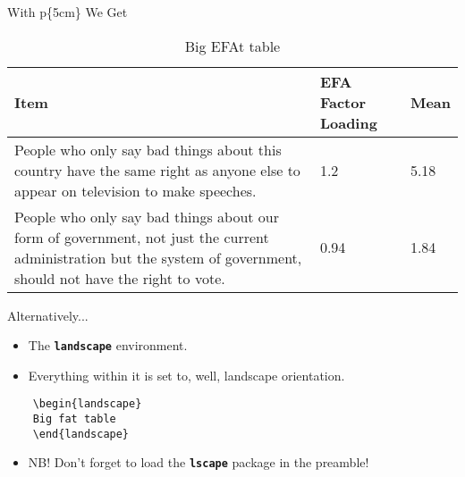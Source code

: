 \documentclass{beamer}
\newcommand{\bftt}[1]{\textbf{\texttt{#1}}}
\newcommand{\cmd}[1]{{\color[HTML]{008000}\bftt{#1}}}
\begin{document}
\begin{frame}{With p\{5cm\} We Get}
	\begin{table}
		\caption{Big EFAt table}
		\begin{tabular}{p{5cm} l l} \toprule
			\textbf{Item} & \textbf{EFA Factor Loading}
			&  \textbf{Mean} \\ \midrule
			People who only say bad things about this country have
			the same right as anyone else to appear on television 
			to make speeches. & 1.2 & 5.18 \\
			People who only say bad things about our form of 
			government, not just the current administration but the 
			system of government, should not have the right to 
			vote. & 0.94 & 1.84 \\ \bottomrule 
		\end{tabular}
	\end{table}
\end{frame} 

\begin{frame}[fragile]{Alternatively...}
	\begin{itemize}
		\item The \cmd{landscape} environment.
		\item Everything within it is set to, well, landscape orientation.
	\end{itemize}
	\begin{verbatim}
	\begin{landscape}
	Big fat table
	\end{landscape}
	\end{verbatim}
	\begin{itemize}
		\item NB! Don't forget to load the \cmd{lscape} package in the preamble!
	\end{itemize}
\end{frame}
\end{document}
